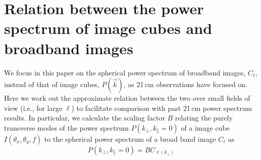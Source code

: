 \documentclass{emulateapj}
\newcommand{\IR}{\text{IR}}
\newcommand{\shot}{\text{shot}}
\begin{document}
%
%

\section{Relation between the power spectrum of image cubes and broadband images}
\label{sec:pspecrelation}

We focus in this paper on the spherical power spectrum of broadband images, $C_\ell$,  instead of that of image cubes, $P(\vec{k})$, as 21\,cm observations have focused on. Here we work out the approximate relation between the two over small fields of view (i.e., for large $\ell$) to facilitate comparison with past 21\,cm power spectrum results. In particular, we calculate the scaling factor $B$ relating the purely transverse modes of the power spectrum $P(k_\perp,k_\parallel=0)$ of a image cube $I(\theta_x,\theta_y,f)$ to the spherical power spectrum of a broad band image $C_\ell$ as
\begin{equation}
P(k_\perp,k_\parallel=0) = B C_{\ell(k_\perp)}
\end{equation}
\end{document}
